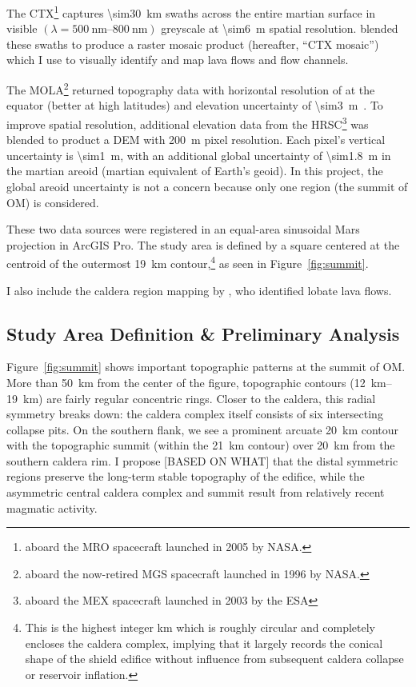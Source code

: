 The \acf{CTX}\footnote{aboard the \ac{MRO} spacecraft launched in 2005 by \acs{NASA}.} captures \qty{\sim30}{\km} swaths across the entire martian surface in visible $(\lambda=\qtyrange{500}{800}{\nm})$ greyscale at \qty{\sim6}{\m} spatial resolution. \textcite{Dickson2018AGB} blended these swaths to produce a raster mosaic product (hereafter, ``\ac{CTX} mosaic'') which I use to visually identify and map lava flows and flow channels.

The \acf{MOLA}\footnote{aboard the now-retired \ac{MGS} spacecraft launched in 1996 by \acs{NASA}.} returned topography data with horizontal resolution of  at the equator (better at high latitudes) and elevation uncertainty of \qty{\sim3}{\m}~\parencite{smith_mars_2001}. To improve spatial resolution, additional elevation data from the \ac{HRSC}\footnote{aboard the \ac{MEX} spacecraft launched in 2003 by the \ac{ESA}} was blended to product a \ac{DEM} with \qty{200}{\m} pixel resolution. Each pixel's vertical uncertainty is \qty{\sim1}{\m}, with an additional global uncertainty of \qty{\sim1.8}{\m} in the martian areoid (martian equivalent of Earth's geoid). In this project, the global areoid uncertainty is not a concern because only one region (the summit of \ac{OM}) is considered.

These two data sources were registered in an equal-area sinusoidal Mars projection in ArcGIS Pro. The study area is defined by a square  centered at the centroid of the outermost \qty{19}{\km} contour,\footnote{This is the highest integer \unit{km} which is roughly circular and completely encloses the caldera complex, implying that it largely records the conical shape of the shield edifice without influence from subsequent caldera collapse or reservoir inflation.} as seen in Figure~\ref{fig:summit}.

I also include the caldera region mapping by \textcite{mouginis-mark_geologic_2021}, who identified lobate lava flows.

\subsection{Study Area Definition \& Preliminary Analysis}

Figure~\ref{fig:summit} shows important topographic patterns at the summit of \ac{OM}. More than \qty{50}{\km} from the center of the figure, topographic contours (\qtyrange{12}{19}{\km}) are fairly regular concentric rings. Closer to the caldera, this radial symmetry breaks down: the caldera complex itself consists of six intersecting collapse pits. On the southern flank, we see a prominent arcuate \qty{20}{\km} contour with the topographic summit (within the \qty{21}{\km} contour) over \qty{20}{\km} from the southern caldera rim. I propose [BASED ON WHAT] that the distal symmetric regions preserve the long-term stable topography of the edifice, while the asymmetric central caldera complex and summit result from relatively recent magmatic activity. 

